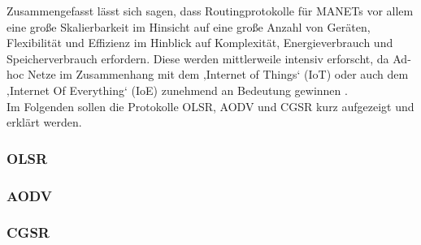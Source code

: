 Zusammengefasst lässt sich sagen, dass Routingprotokolle für MANETs vor allem eine große Skalierbarkeit im Hinsicht auf eine große Anzahl von Geräten, Flexibilität und Effizienz im Hinblick auf Komplexität, Energieverbrauch und Speicherverbrauch erfordern. Diese werden mittlerweile intensiv erforscht, da Ad-hoc Netze im Zusammenhang mit dem ‚Internet of Things‘ (IoT) oder auch dem ‚Internet Of Everything‘ (IoE) zunehmend an Bedeutung gewinnen \cite{d:timm}. \\

Im Folgenden sollen die Protokolle OLSR, AODV und CGSR kurz aufgezeigt und erklärt werden.

\subsubsection{OLSR}\label{ss:OLSR}

\subsubsection{AODV}\label{ss:AODV}

\subsubsection{CGSR}\label{ss:CGSR}

